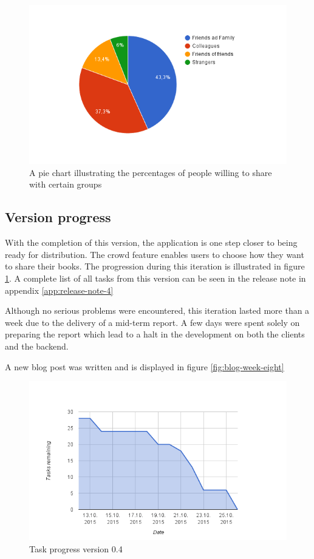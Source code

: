\begin{figure}
\centering
\includegraphics[width=\textwidth]{figs/v04/feedback-pie.png}
\caption{A pie chart illustrating the percentages of people willing to share with certain groups}
\label{fig:0.4-survey-feedback}
\end{figure}


\subsection{Version progress}

With the completion of this version, the application is one step closer to being ready for distribution. The crowd feature enables users to choose how they want to share their books. The progression during this iteration is illustrated in figure \ref{fig:0.4-survey-feedback}. A complete list of all tasks from this version can be seen in the release note in appendix \ref{app:release-note-4}

Although no serious problems were encountered, this iteration lasted more than a week due to the delivery of a mid-term report. A few days were spent solely on preparing the report which lead to a halt in the development on both the clients and the backend. 

A new blog post was written and is displayed in figure \ref{fig:blog-week-eight}

\begin{figure}
\centering
\includegraphics[width=\textwidth]{figs/v04/version-progress-4.png}
\caption{Task progress version 0.4}
\label{fig:version-progress-4}
\end{figure}

